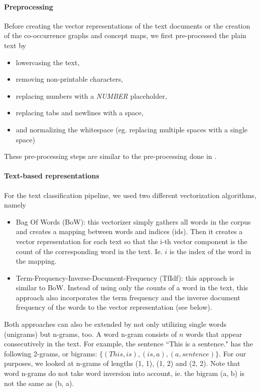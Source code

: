 \paragraph{Preprocessing}
Before creating the vector representations of the text documents or the creation of the co-occurrence graphs and concept maps, we first pre-processed the plain text by

\begin{itemize}
\item{lowercasing the text,}
\item{removing non-printable characters,}
\item{replacing numbers with a \textit{NUMBER} placeholder,}
\item{replacing tabs and newlines with a space,}
\item{and normalizing the whitespace (eg. replacing multiple spaces with a single space)}
\end{itemize}
These pre-processing steps are similar to the pre-processing done in \cite{Cachopo2007}.


\paragraph{Text-based representations}
For the text classification pipeline, we used two different vectorization algorithms, namely
\begin{itemize}
\item{Bag Of Words (BoW): this vectorizer simply gathers all words in the corpus and creates a mapping between words and indices (ids). Then it creates a vector representation for each text so that the i-th vector component  is the count of the corresponding word in the text. Ie. $i$ is the index of the word in the mapping.}
\item{Term-Frequency-Inverse-Document-Frequency (TfIdf): this approach is similar to BoW. Instead of using only the counts of a word in the text, this approach also incorporates the term frequency and the inverse document frequency of the words to the vector representation (see below).}
\end{itemize}
Both approaches can also be extended by not only utilizing single words (unigrams) but n-grams, too. A word n-gram consists of $n$ words that appear consecutively in the text.
For example, the sentence ``This is a sentence." has the following 2-grams, or bigrams: $\{ (This, is), (is, a), (a, sentence) \}$.
For our purposes, we looked at n-grams of lengths (1, 1), (1, 2) and (2, 2).
Note that word n-grams do not take word inversion into account, ie. the bigram (a, b) is not the same as (b, a).

